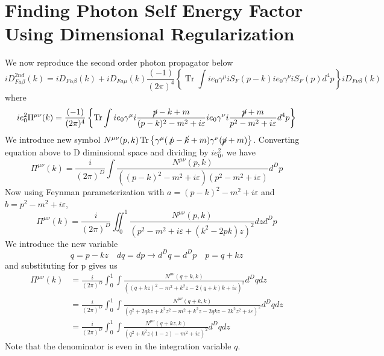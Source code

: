 \section{Finding Photon Self Energy Factor Using Dimensional Regularization}
We now reproduce the second order photon propagator below
\begin{equation}
i D_{F a \beta}^{2 n d}(k)=i D_{F \alpha \beta}(k)+i D_{F a \mu}(k)\frac{(-1)}{(2 \pi)^{4}}\left\{\operatorname{Tr} \int i e_{0} \gamma^{\mu} i S_{F}(p-k) i e_{0} \gamma^{\nu} i S_{F}(p) d^{4} p\right\} i D_{F \nu \beta}(k)
\end{equation}
where
\begin{equation}
i e_{0}^{2} \Pi^{\mu \nu}(k)=\frac{(-1)}{(2 \pi)^{4}}\left\{\operatorname{Tr} \int i e_{0} \gamma^{\mu} i \frac{\cancel{p}-k+m}{(p-k)^{2}-m^{2}+i \varepsilon} i e_{0} \gamma^{\nu}i \frac{\cancel{p}+m}{p^{2}-m^{2}+i \varepsilon} d^{4} p\right\}
\end{equation}
We introduce new symbol $N^{\mu\nu}(p,k)\operatorname{Tr}\left\{\gamma^{\mu}(\not p-\cancel{k}+m) \gamma^{\nu}(\cancel{p}+m)\right\}$. Converting equation above to D diminsional space and dividing by $ie_0^2$, we have
\begin{equation}
\Pi^{\mu \nu}(k)=\frac{i}{(2 \pi)^{D}} \int \frac{N^{\mu \nu}(p, k)}{\left((p-k)^{2}-m^{2}+i \varepsilon\right)\left(p^{2}-m^{2}+i \varepsilon\right)} d^{D} p
\end{equation}
Now using Feynman parameterization with $a=(p-k)^{2}-m^{2}+i \varepsilon$ and $b=p^{2}-m^{2}+i \varepsilon$,
$$\Pi^{\mu \nu}(k)=\frac{i}{(2 \pi)^{D}} \iint_{0}^{1} \frac{N^{\mu \nu}(p, k)}{\left(p^{2}-m^{2}+i \varepsilon+\left(k^{2}-2 p k\right) z\right)^{2}} d z d^{D} p$$
We introduce the new variable
$$q=p-k z \quad d q=d p \rightarrow d^{D} q=d^{D} p \quad p=q+k z$$
and substituting for p gives us
\begin{equation}\begin{aligned}
\Pi^{\mu \nu}(k) &=\frac{i}{(2 \pi)^{D}} \int_{0}^{1} \int \frac{N^{\mu \nu}(q+k, k)}{\left((q+k z)^{2}-m^{2}+k^{2} z-2(q+k) k+i \varepsilon\right)^{2}} d^{D} q d z \\
&=\frac{i}{(2 \pi)^{D}} \int_{0}^{1} \int \frac{N^{\mu \nu}(q+k, k)}{\left(q^{2}+2 q k z+k^{2} z^{2}-m^{2}+k^{2} z-2 q k z-2 k^{2} z^{2}+i \varepsilon\right)^{2}} d^{D} q d z\\
&=\frac{i}{(2 \pi)^{D}} \int_{0}^{1} \int \frac{N^{\mu \nu}(q+k z, k)}{\left(q^{2}+k^{2} z(1-z)-m^{2}+i \varepsilon\right)^{2}} d^{D} q d z
\end{aligned}\end{equation}
Note that the denominator is even in the integration variable $q$.

